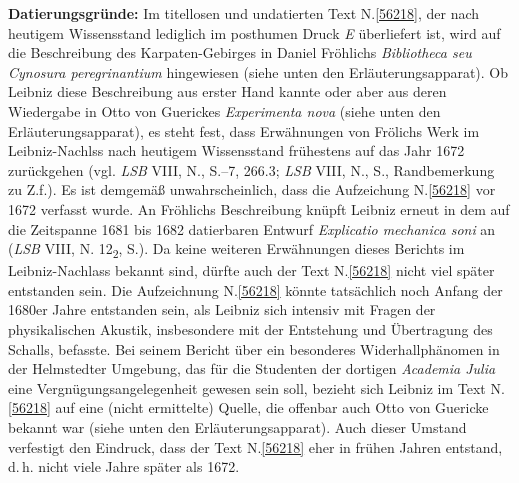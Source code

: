 \begin{ledgroup}%
\footnotesize%
\pstart%
\noindent%
\textbf{Datierungsgründe:}
Im titellosen und undatierten Text N.\;\ref{56218}, der nach heutigem Wissensstand lediglich im posthumen Druck \textit{E} %
überliefert ist, wird auf die Beschreibung des Karpaten-Gebirges in Daniel Fröhlichs %
\textit{Bibliotheca seu Cynosura peregrinantium}\cite{00047} %
hingewiesen (siehe unten den Erläuterungsapparat).
Ob Leibniz diese Beschreibung aus erster Hand kannte oder aber aus deren Wiedergabe in Otto von Guerickes %
\textit{Experimenta nova} (siehe unten den Erläuterungsapparat), %
es steht fest, dass Erwähnungen von Frölichs Werk im Leibniz-Nachlss nach heutigem Wissensstand frühestens auf das Jahr 1672 zurückgehen (vgl. \textit{LSB} VIII, N., S.--7, 266.3; \textit{LSB} VIII, N., S., Randbemerkung zu Z.\:f.).\cite{01197}\cite{01278}
Es ist demgemäß unwahrscheinlich, dass die Aufzeichung N.\;\ref{56218} vor 1672 verfasst wurde.
\pend%
\pstart%
An Fröhlichs Beschreibung knüpft Leibniz erneut in dem auf die Zeitspanne 1681 bis 1682 datierbaren Entwurf \textit{Explicatio mechanica soni} an (\textit{LSB} VIII, N. 12\textsubscript{2}, S.).\cite{01481}
Da keine weiteren Erwähnungen dieses Berichts im Leibniz-Nachlass bekannt sind, dürfte auch der Text N.\;\ref{56218} nicht viel später entstanden sein.
Die Aufzeichnung N.\;\ref{56218} könnte tatsächlich noch Anfang der 1680er Jahre entstanden sein, als Leibniz sich intensiv mit Fragen der physikalischen Akustik, insbesondere mit der Entstehung und Übertragung des Schalls, befasste.
\pend%
\pstart%
Bei seinem Bericht über ein besonderes Widerhallphänomen in der Helmstedter Umgebung, das für die Studenten der dortigen \textit{Academia Julia} eine Vergnügungsangelegenheit gewesen sein soll, bezieht sich Leibniz im Text N.\;\ref{56218} auf eine (nicht ermittelte) Quelle, die offenbar auch Otto von Guericke bekannt war (siehe unten den Erläuterungsapparat).
Auch dieser Umstand verfestigt den Eindruck, dass der Text N.\;\ref{56218} eher in frühen Jahren entstand, d.\,h. nicht viele Jahre später als 1672.
\pend%
\end{ledgroup}%
%
\frenchspacing%
\newpage%
